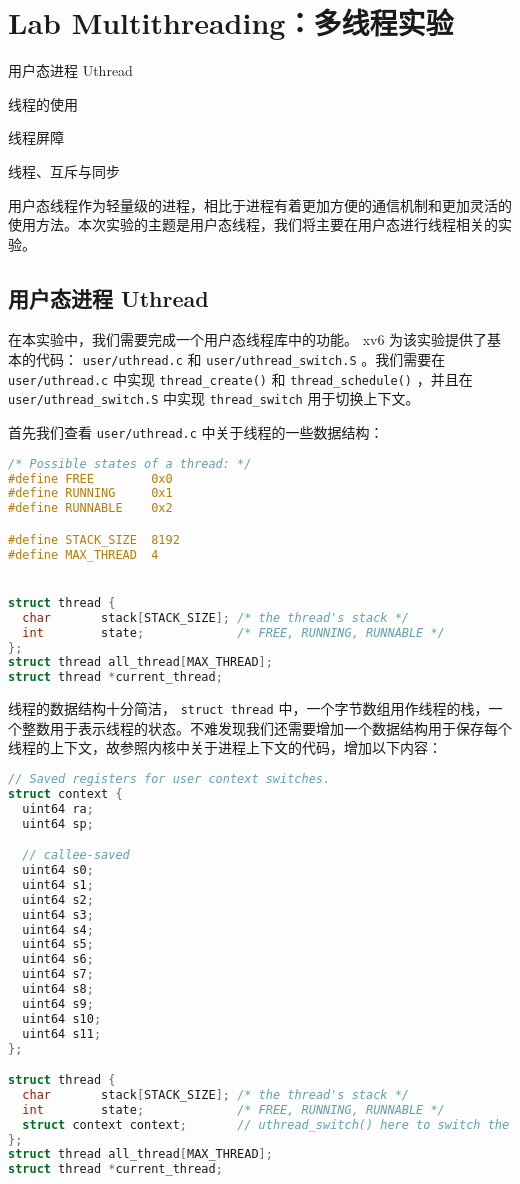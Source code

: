 \chapter{Lab Multithreading：多线程实验}
\begin{introduction}
    \item 用户态进程 Uthread
    \item 线程的使用
    \item 线程屏障
    \item 线程、互斥与同步
\end{introduction}

用户态线程作为轻量级的进程，相比于进程有着更加方便的通信机制和更加灵活的使用方法。本次实验的主题是用户态线程，我们将主要在用户态进行线程相关的实验。

\section{用户态进程 Uthread}

在本实验中，我们需要完成一个用户态线程库中的功能。 xv6 为该实验提供了基本的代码： \lstinline{user/uthread.c} 和 \lstinline{user/uthread_switch.S} 。我们需要在 \lstinline{user/uthread.c} 中实现 \lstinline{thread_create()} 和 \lstinline{thread_schedule()} ，并且在 \lstinline{user/uthread_switch.S} 中实现 \lstinline{thread_switch} 用于切换上下文。

首先我们查看 \lstinline{user/uthread.c} 中关于线程的一些数据结构：
\begin{lstlisting}[language=C]
/* Possible states of a thread: */
#define FREE        0x0
#define RUNNING     0x1
#define RUNNABLE    0x2

#define STACK_SIZE  8192
#define MAX_THREAD  4


struct thread {
  char       stack[STACK_SIZE]; /* the thread's stack */
  int        state;             /* FREE, RUNNING, RUNNABLE */
};
struct thread all_thread[MAX_THREAD];
struct thread *current_thread;
\end{lstlisting}

线程的数据结构十分简洁， \lstinline{struct thread} 中，一个字节数组用作线程的栈，一个整数用于表示线程的状态。不难发现我们还需要增加一个数据结构用于保存每个线程的上下文，故参照内核中关于进程上下文的代码，增加以下内容：
\begin{lstlisting}[language=C]
// Saved registers for user context switches.
struct context {
  uint64 ra;
  uint64 sp;

  // callee-saved
  uint64 s0;
  uint64 s1;
  uint64 s2;
  uint64 s3;
  uint64 s4;
  uint64 s5;
  uint64 s6;
  uint64 s7;
  uint64 s8;
  uint64 s9;
  uint64 s10;
  uint64 s11;
};

struct thread {
  char       stack[STACK_SIZE]; /* the thread's stack */
  int        state;             /* FREE, RUNNING, RUNNABLE */
  struct context context;       // uthread_switch() here to switch the thread
};
struct thread all_thread[MAX_THREAD];
struct thread *current_thread;
\end{lstlisting}

